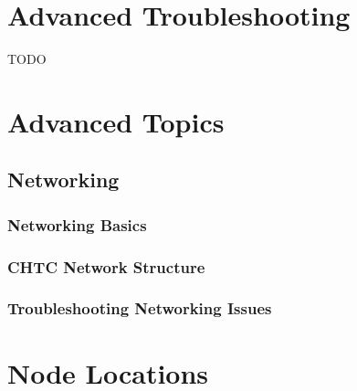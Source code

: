 \documentclass[10pt,letterpaper]{article}
\begin{document}
\section{Advanced Troubleshooting}
    TODO
\clearpage

\section{Advanced Topics}
    \subsection{Networking}
        \subsubsection{Networking Basics}
        \subsubsection{CHTC Network Structure}
        \subsubsection{Troubleshooting Networking Issues}

\clearpage


\appendix
\section{Node Locations}
\end{document}
